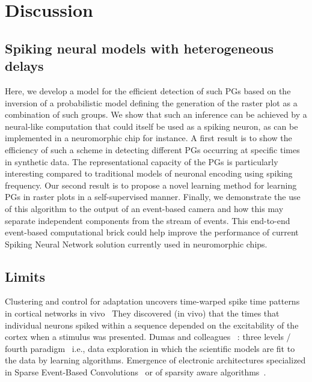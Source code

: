 \documentclass[brainsci, %
               review,submit,pdftex,moreauthors%
               ]{Definitions/mdpi}
\begin{document}






\section{Discussion}\label{sec:discussion}
\subsection{Spiking neural models with heterogeneous delays}
Here, we develop a model for the efficient detection of such PGs based on the inversion of a probabilistic model defining the generation of the raster plot as a combination of such groups. We show that such an inference can be achieved by a neural-like computation that could itself be used as a spiking neuron, as can be implemented in a neuromorphic chip for instance. A first result is to show the efficiency of such a scheme in detecting different PGs occurring at specific times in synthetic data. The representational capacity of the PGs is particularly interesting compared to traditional models of neuronal encoding using spiking frequency. Our second result is to propose a novel learning method for learning PGs in raster plots in a self-supervised manner. Finally, we demonstrate the use of this algorithm to the output of an event-based camera and how this may separate independent components from the stream of events. This end-to-end event-based computational brick could help improve the performance of current Spiking Neural Network solution currently used in neuromorphic chips.


\subsection{Limits}

Clustering and control for adaptation uncovers time-warped spike time patterns in cortical networks in vivo~\citep{Isbister} They discovered (in vivo) that the times that individual neurons spiked within a sequence depended on the excitability of the cortex when a stimulus was presented.
Dumas and colleagues~\citep{panahi_generative_2021} : three levels / fourth paradigm~\citep{tolle_fourth_2011} i.e., data exploration in which the scientific models are fit to the data by learning algorithms.
Emergence of electronic architectures specialized in Sparse Event-Based Convolutions~\citep{di_mauro_alfio_sne_2022} or of sparsity aware algorithms~\citep{yin_sata_2022}.
\end{document}
